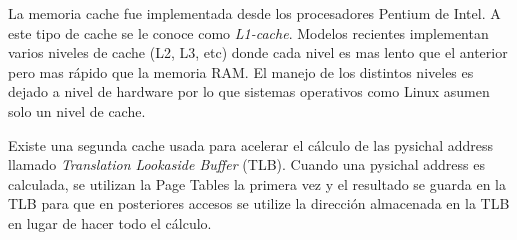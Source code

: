 La memoria cache fue implementada desde los procesadores Pentium de Intel. A
este tipo de cache se le conoce como \emph{L1-cache}. Modelos recientes
implementan varios niveles de cache (L2, L3, etc) donde cada nivel es mas lento
que el anterior pero mas rápido que la memoria RAM. El manejo de los distintos
niveles es dejado a nivel de hardware por lo que sistemas operativos como Linux
asumen solo un nivel de cache.

Existe una segunda cache usada para acelerar el cálculo de las pysichal address
llamado \emph{Translation Lookaside Buffer} (TLB). Cuando una pysichal address
es calculada, se utilizan la Page Tables la primera vez y el resultado se
guarda en la TLB para que en posteriores accesos se utilize la dirección
almacenada en la TLB en lugar de hacer todo el cálculo.

